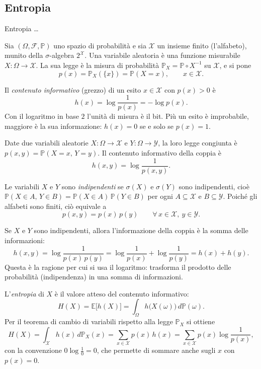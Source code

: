 \subsection{Entropia}
\begin{defi}
Entropia \dots %
\end{defi}
\begin{defi}
Sia $(\Omega,\mathcal{F},\mathbb{P})$ uno spazio di probabilità e sia $\mathcal{X}$ un insieme finito (l'alfabeto), munito della $\sigma$-algebra $2^{\mathcal{X}}$. Una variabile aleatoria è una funzione misurabile $X\colon \Omega \to \mathcal{X}$. La sua legge è la misura di probabilità $\mathbb{P}_X = \mathbb{P}\circ X^{-1}$ su $\mathcal{X}$, e si pone
\[
p(x) = \mathbb{P}_X(\{x\}) = \mathbb{P}(X = x), \qquad x \in \mathcal{X}.
\]
\end{defi}
\begin{defi}
Il \textit{contenuto informativo} (grezzo) di un esito $x\in\mathcal{X}$ con $p(x)>0$ è
\[
h(x) = \log \frac{1}{p(x)} = -\log p(x).
\]
Con il logaritmo in base $2$ l'unità di misura è il bit. Più un esito è improbabile, maggiore è la sua informazione: $h(x)=0$ se e solo se $p(x)=1$.
\end{defi}
\begin{defi}
Date due variabili aleatorie $X\colon\Omega\to\mathcal{X}$ e $Y\colon\Omega\to\mathcal{Y}$, la loro legge congiunta è $p(x,y)=\mathbb{P}(X=x,\,Y=y)$. Il contenuto informativo della coppia è
\[
h(x,y) = \log \frac{1}{p(x,y)}.
\]
\end{defi}
\begin{defi}
Le variabili $X$ e $Y$ sono \textit{indipendenti} se $\sigma(X)$ e $\sigma(Y)$ sono indipendenti, cioè $\mathbb{P}(X\in A,\, Y\in B)=\mathbb{P}(X\in A)\,\mathbb{P}(Y\in B)$ per ogni $A\subseteq\mathcal{X}$ e $B\subseteq\mathcal{Y}$. Poiché gli alfabeti sono finiti, ciò equivale a
\[
p(x,y) = p(x)\,p(y) \qquad \forall\, x\in\mathcal{X},\ y\in\mathcal{Y}.
\]
\end{defi}
\begin{rema}
Se $X$ e $Y$ sono indipendenti, allora l'informazione della coppia è la somma delle informazioni:
\[
h(x,y) = \log\frac{1}{p(x)\,p(y)} = \log\frac{1}{p(x)} + \log\frac{1}{p(y)} = h(x) + h(y).
\]
Questa è la ragione per cui si usa il logaritmo: trasforma il prodotto delle probabilità (indipendenza) in una somma di informazioni.
\end{rema}
\begin{defi}
L'\textit{entropia} di $X$ è il valore atteso del contenuto informativo:
\[
H(X) = \mathbb{E}\big[h(X)\big] = \int_{\Omega} h\big(X(\omega)\big)\, d\mathbb{P}(\omega).
\]
Per il teorema di cambio di variabili rispetto alla legge $\mathbb{P}_X$ si ottiene
\[
H(X) = \int_{\mathcal{X}} h(x)\, d\mathbb{P}_X(x) = \sum_{x\in\mathcal{X}} p(x)\, h(x) = \sum_{x\in\mathcal{X}} p(x)\log\frac{1}{p(x)},
\]
con la convenzione $0\log\frac{1}{0}=0$, che permette di sommare anche sugli $x$ con $p(x)=0$.
\end{defi}
